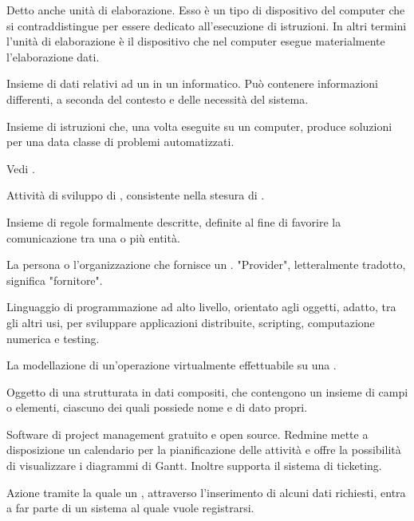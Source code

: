 {Detto anche unità di elaborazione. Esso è un tipo di dispositivo  del computer che si contraddistingue per essere dedicato all'esecuzione di istruzioni. In altri termini l'unità di elaborazione è il dispositivo che nel computer esegue materialmente l'elaborazione dati.}

{Insieme di dati relativi ad un  in un  informatico. Può contenere informazioni differenti, a seconda del contesto e delle necessità del sistema.}

{Insieme di istruzioni che, una volta eseguite su un computer, produce soluzioni per una data classe di problemi automatizzati.}

{Vedi .}

{Attività di sviluppo di , consistente nella stesura di .}

{Insieme di regole formalmente descritte, definite al fine di favorire la comunicazione tra una o più entità.}

{La persona o l'organizzazione che fornisce un . "Provider", letteralmente tradotto, significa "fornitore".}

{Linguaggio di programmazione ad alto livello, orientato agli oggetti, adatto, tra gli altri usi, per sviluppare applicazioni distribuite, scripting, computazione numerica e testing.}




{La modellazione di un'operazione virtualmente effettuabile su una .}




{Oggetto di una  strutturata in dati compositi, che contengono un insieme di campi o elementi, ciascuno dei quali possiede nome e  di dato propri.}

{Software di project management gratuito e open source. Redmine mette a disposizione un calendario per la pianificazione delle attività e offre la possibilità di visualizzare i diagrammi di Gantt. Inoltre supporta il sistema di ticketing.}

{Azione tramite la quale un , attraverso l'inserimento di alcuni dati richiesti, entra a far parte di un sistema al quale vuole registrarsi.}

